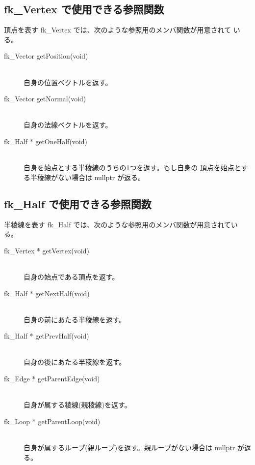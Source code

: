 \subsection{fk\_Vertex で使用できる参照関数}
頂点を表す fk\_Vertex では、次のような参照用のメンバ関数が用意されて
いる。
\begin{description}
 \item[\hspace*{0.6cm}fk\_Vector getPosition(void)] ~ \\
	自身の位置ベクトルを返す。
 \item[\hspace*{0.6cm}fk\_Vector getNormal(void)] ~ \\
	自身の法線ベクトルを返す。
 \item[\hspace*{0.6cm}fk\_Half * getOneHalf(void)] ~ \\
	自身を始点とする半稜線のうちの1つを返す。もし自身の
	頂点を始点とする半稜線がない場合は nullptr が返る。
\end{description}

\subsection{fk\_Half で使用できる参照関数}
半稜線を表す fk\_Half では、次のような参照用のメンバ関数が用意されている。
\begin{description}
 \item[\hspace*{0.6cm}fk\_Vertex * getVertex(void)] ~ \\
	自身の始点である頂点を返す。
 \item[\hspace*{0.6cm}fk\_Half * getNextHalf(void)] ~ \\
	自身の前にあたる半稜線を返す。
 \item[\hspace*{0.6cm}fk\_Half * getPrevHalf(void)] ~ \\
	自身の後にあたる半稜線を返す。
 \item[\hspace*{0.6cm}fk\_Edge * getParentEdge(void)] ~ \\
	自身が属する稜線(親稜線)を返す。
 \item[\hspace*{0.6cm}fk\_Loop * getParentLoop(void)] ~ \\
	自身が属するループ(親ループ)を返す。親ループがない場合は
	nullptr が返る。
\end{description}

